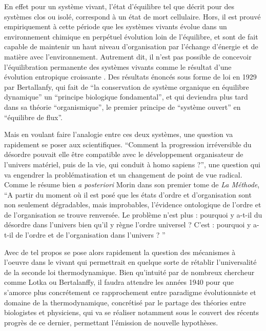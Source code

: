 En effet pour un système vivant, l'état d'équilibre tel que décrit pour des systèmes clos ou isolé, correspond à un état de mort cellulaire. Hors, il est prouvé empiriquement à cette période que les systèmes vivants évolue dans un environnement chimique en perpétuel évolution loin de l'équilibre, et sont de fait capable de maintenir un haut niveau d'organisation par l'échange d'énergie et de matière avec l'environnement. Autrement dit, il n'est pas possible de concevoir l'équilibration permanente des systèmes vivants comme le résultat d'une évolution entropique croissante \autocite[248]{Lemoigne1977}. Des résultats énoncés sous forme de loi en 1929 par Bertallanfy, qui fait de \enquote{la conservation de système organique en équilibre dynamique} un \enquote{principe biologique fondamental}, et qui deviendra plus tard dans sa théorie \enquote{organismique}, le premier principe de  \enquote{système ouvert} en \enquote{équilibre de flux}. \autocite[492]{Pouvreau2013} 

Mais en voulant faire l'analogie entre ces deux systèmes, une question va rapidement se poser aux scientifiques. \enquote{Comment la progression irréversible du désordre pouvait elle être compatible avec le développement organisateur de l'univers matériel, puis de la vie, qui conduit à homo sapiens ?}, une question qui va engendrer la problématisation et un changement de point de vue radical. Comme le résume bien \textit{a posteriori} Morin dans son premier tome de \textit{La Méthode}, \enquote{A partir du moment où il est posé que les états d'ordre et d'organisation sont non seulement dégradables, mais improbables, l'évidence ontologique de l'ordre et de l'organisation se trouve renversée. Le problème n'est plus : pourquoi y a-t-il du désordre dans l'univers bien qu'il y règne l'ordre universel ? C'est : pourquoi y a-t-il de l'ordre et de l'organisation dans l'univers ? } \autocite[37]{Morin1977}

Avec de tel propos se pose alors rapidement la question des mécanismes à l'oeuvre dans le vivant qui permettrait en quelque sorte de rétablir l'universalité de la seconde loi thermodynamique. Bien qu'intuité par de nombreux chercheur comme Lotka ou Bertalanffy, il faudra attendre les années 1940 pour que s'amorce plus concrétement ce rapprochement entre paradigme évolutionniste et domaine de la thermodynamique, concrétisé par le partage des théories entre biologistes et physiciens, qui va se réaliser notamment sous le couvert des récents progrès de ce dernier, permettant l'émission de nouvelle hypothèses. 

